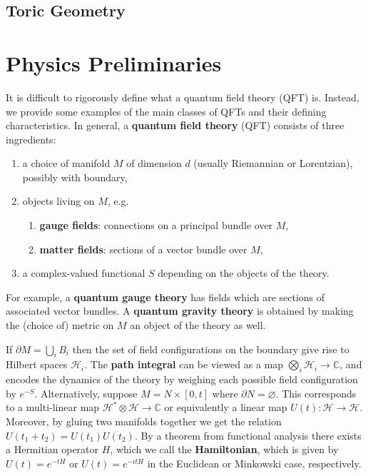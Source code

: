 \documentclass{report}
\theoremstyle{plain}
\theoremstyle{definition}
\theoremstyle{remark}
\newcommand{\di}{\partial}
\newcommand{\bC}{\mathbb{C}}
\newcommand{\mc}{\mathcal}
\newcommand{\ten}{\otimes}
\begin{document}
\section{Toric Geometry}

\chapter{Physics Preliminaries}

It is difficult to rigorously define what a quantum field theory (QFT)
is. Instead, we provide some examples of the main classes of QFTs and
their defining characteristics. In general, a {\bf quantum field
  theory} (QFT) consists of three ingredients:
\begin{enumerate}
\item a choice of manifold $M$ of dimension $d$ (usually Riemannian or
  Lorentzian), possibly with boundary,
\item objects living on $M$, e.g.
  \begin{enumerate}
  \item {\bf gauge fields}: connections on a principal bundle over
    $M$,
  \item {\bf matter fields}: sections of a vector bundle over $M$,
  \end{enumerate}
\item a complex-valued functional $S$ depending on the objects of the
  theory.
\end{enumerate}
For example, a \textbf{quantum gauge theory} has fields which are
sections of associated vector bundles. A \textbf{quantum gravity
  theory} is obtained by making the (choice of) metric on $M$ an
object of the theory as well.

If $\di M = \bigcup_i B_i$ then the set of field configurations on the
boundary give rise to Hilbert spaces $\mc H_i$. The {\bf path
  integral} can be viewed as a map $\bigotimes_i\mc H_i\to \bC$, and
encodes the dynamics of the theory by weighing each possible field
configuration by $e^{-S}$. Alternatively, suppose $M=N\times [0,t]$
where $\di N = \varnothing$. This corresponds to a multi-linear map
$\mc H^*\ten\mc H\to\bC$ or equivalently a linear map $U(t)\colon\mc
H\to \mc H$. Moreover, by gluing two manifolds together we get the
relation $U(t_1+t_2)=U(t_1)U(t_2)$. By a theorem from functional
analysis there exists a Hermitian operator $H$, which we call the {\bf
  Hamiltonian}, which is given by $U(t) = e^{-tH}$ or $U(t) =
e^{-itH}$ in the Euclidean or Minkowski case, respectively.
\end{document}

